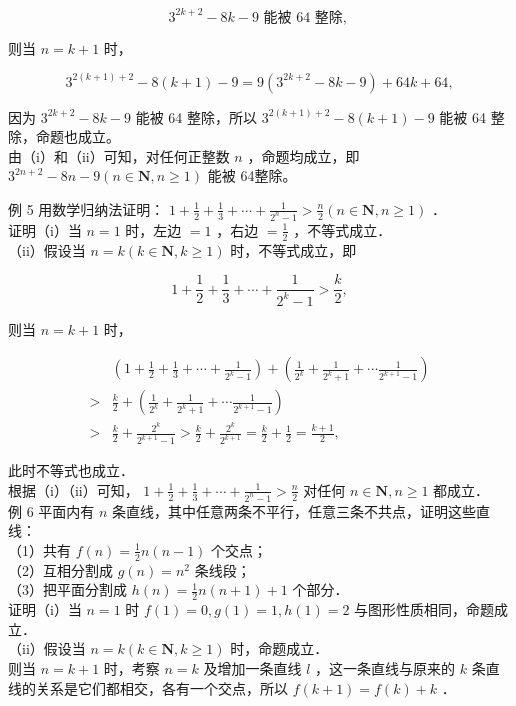 \documentclass[10pt]{article}
\begin{document}
\[
3^{2 k+2}-8 k-9 \text { 能被 } 64 \text { 整除, }
\]

则当 \(n=k+1\) 时，

\[
3^{2(k+1)+2}-8(k+1)-9=9\left(3^{2 k+2}-8 k-9\right)+64 k+64,
\]

因为 \(3^{2 k+2}-8 k-9\) 能被 64 整除，所以 \(3^{2(k+1)+2}-8(k+1)-9\) 能被 64 整除，命题也成立。\\
由（i）和（ii）可知，对任何正整数 \(n\) ，命题均成立，即 \(3^{2 n+2}-8 n-9(n \in \mathbf{N}, n \geqslant 1)\) 能被 64整除。

例 5 用数学归纳法证明： \(1+\frac{1}{2}+\frac{1}{3}+\cdots+\frac{1}{2^{n}-1}>\frac{n}{2}(n \in \mathbf{N}, n \geqslant 1)\) ．\\
证明（i）当 \(n=1\) 时，左边 \(=1\) ，右边 \(=\frac{1}{2}\) ，不等式成立．\\
（ii）假设当 \(n=k(k \in \mathbf{N}, k \geqslant 1)\) 时，不等式成立，即

\[
1+\frac{1}{2}+\frac{1}{3}+\cdots+\frac{1}{2^{k}-1}>\frac{k}{2},
\]

则当 \(n=k+1\) 时，

\[
\begin{aligned}
& \left(1+\frac{1}{2}+\frac{1}{3}+\cdots+\frac{1}{2^{k}-1}\right)+\left(\frac{1}{2^{k}}+\frac{1}{2^{k}+1}+\cdots \frac{1}{2^{k+1}-1}\right) \\
> & \frac{k}{2}+\left(\frac{1}{2^{k}}+\frac{1}{2^{k}+1}+\cdots \frac{1}{2^{k+1}-1}\right) \\
> & \frac{k}{2}+\frac{2^{k}}{2^{k+1}-1}>\frac{k}{2}+\frac{2^{k}}{2^{k+1}}=\frac{k}{2}+\frac{1}{2}=\frac{k+1}{2},
\end{aligned}
\]

此时不等式也成立．\\
根据（i）（ii）可知， \(1+\frac{1}{2}+\frac{1}{3}+\cdots+\frac{1}{2^{n}-1}>\frac{n}{2}\) 对任何 \(n \in \mathbf{N}, n \geqslant 1\) 都成立．\\
例 6 平面内有 \(n\) 条直线，其中任意两条不平行，任意三条不共点，证明这些直线：\\
（1）共有 \(f(n)=\frac{1}{2} n(n-1)\) 个交点；\\
（2）互相分割成 \(g(n)=n^{2}\) 条线段；\\
（3）把平面分割成 \(h(n)=\frac{1}{2} n(n+1)+1\) 个部分．\\
证明（i）当 \(n=1\) 时 \(f(1)=0, g(1)=1, h(1)=2\) 与图形性质相同，命题成立．\\
（ii）假设当 \(n=k(k \in \mathbf{N}, k \geqslant 1)\) 时，命题成立．\\
则当 \(n=k+1\) 时，考察 \(n=k\) 及增加一条直线 \(l\) ，这一条直线与原来的 \(k\) 条直线的关系是它们都相交，各有一个交点，所以 \(f(k+1)=f(k)+k\) ．
\end{document}

